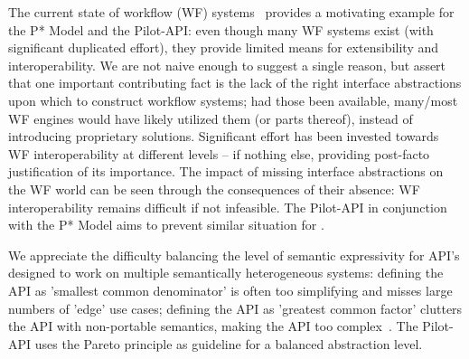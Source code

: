 \documentclass[conference]{IEEEtran}
\begin{document}
The current state of workflow (WF) systems~\cite{nsf-workflow,1196459}
provides a motivating example for the P* Model and the Pilot-API:
even though many WF systems exist (with significant duplicated
effort), they provide limited means for extensibility and
interoperability.  We are not naive enough to suggest a single reason,
but assert that one important contributing fact is the lack of the
right interface abstractions upon which to construct workflow systems;
had those been available, many/most WF engines would have likely
utilized them (or parts thereof), instead of introducing proprietary solutions.
%
%
Significant effort has been invested towards WF interoperability at
different levels -- if nothing else, providing post-facto
justification of its importance. The impact of missing interface
abstractions on the WF world can be seen through the consequences of
their absence: WF interoperability remains difficult if not
infeasible. The Pilot-API in conjunction with the P* Model aims to
prevent similar situation for \pilotjobs.



% 


We appreciate the difficulty balancing the level of semantic
expressivity for API's designed to work on multiple semantically
heterogeneous systems: defining the API as 'smallest common
denominator' is often too simplifying and misses large numbers of
'edge' use cases; defining the API as 'greatest common factor'
clutters the API with non-portable semantics, making the API too
complex~\cite{leaky_abstractions}.  The Pilot-API uses the Pareto
principle as guideline for a balanced abstraction level.
\end{document}
